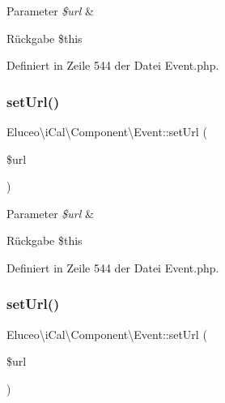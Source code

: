 \begin{DoxyParams}{Parameter}
{\em \$url} & \\
\hline
\end{DoxyParams}
\begin{DoxyReturn}{Rückgabe}
\$this 
\end{DoxyReturn}


Definiert in Zeile 544 der Datei Event.\+php.

\mbox{\label{class_eluceo_1_1i_cal_1_1_component_1_1_event_a35034248d6c68ad41e8cd70e6ba17481}} 
\subsubsection{\texorpdfstring{set\+Url()}{setUrl()}\hspace{0.1cm}{\footnotesize\ttfamily [2/3]}}
{\footnotesize\ttfamily Eluceo\textbackslash{}i\+Cal\textbackslash{}\+Component\textbackslash{}\+Event\+::set\+Url (\begin{DoxyParamCaption}\item[{}]{\$url }\end{DoxyParamCaption})}


\begin{DoxyParams}{Parameter}
{\em \$url} & \\
\hline
\end{DoxyParams}
\begin{DoxyReturn}{Rückgabe}
\$this 
\end{DoxyReturn}


Definiert in Zeile 544 der Datei Event.\+php.

\mbox{\label{class_eluceo_1_1i_cal_1_1_component_1_1_event_a35034248d6c68ad41e8cd70e6ba17481}} 
\subsubsection{\texorpdfstring{set\+Url()}{setUrl()}\hspace{0.1cm}{\footnotesize\ttfamily [3/3]}}
{\footnotesize\ttfamily Eluceo\textbackslash{}i\+Cal\textbackslash{}\+Component\textbackslash{}\+Event\+::set\+Url (\begin{DoxyParamCaption}\item[{}]{\$url }\end{DoxyParamCaption})}



